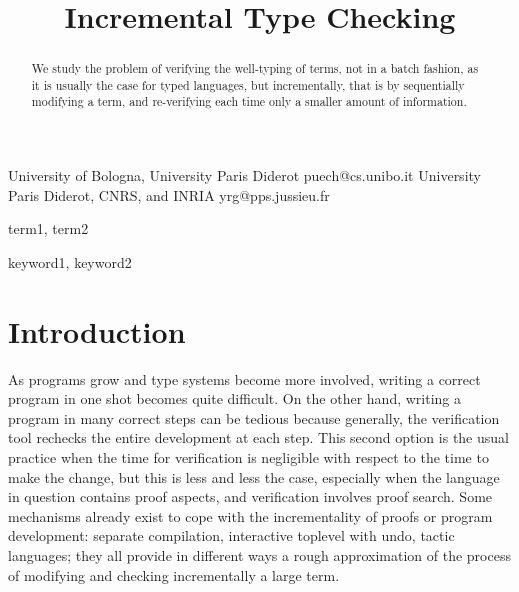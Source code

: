\documentclass[9pt,authoryear]{sigplanconf}
\begin{document}
\copyrightdata{[to be supplied]} 


\title{Incremental Type Checking}

           {University of Bologna, University Paris Diderot}
           {puech@cs.unibo.it}
           {University Paris Diderot, CNRS, and INRIA}
           {yrg@pps.jussieu.fr}

\maketitle

\begin{abstract}
  We study the problem of verifying the well-typing of terms, not in a
  batch fashion, as it is usually the case for typed languages, but
  incrementally, that is by sequentially modifying a term, and
  re-verifying each time only a smaller amount of information.
\end{abstract}


\terms
term1, term2

\keywords
keyword1, keyword2

\section{Introduction}

As programs grow and type systems become more involved, writing a
correct program in one shot becomes quite difficult. On the other
hand, writing a program in many correct steps can be tedious because
generally, the verification tool rechecks the entire development at
each step. This second option is the usual practice when the time for
verification is negligible with respect to the time to make the
change, but this is less and less the case, especially when the
language in question contains proof aspects, and verification involves
proof search. Some mechanisms already exist to cope with the
incrementality of proofs or program development: separate compilation,
interactive toplevel with undo, tactic languages; they all provide in
different ways a rough approximation of the process of modifying and
checking incrementally a large term.
\end{document}

